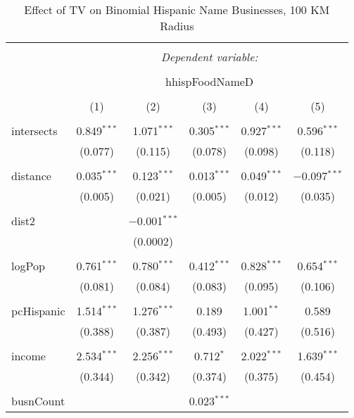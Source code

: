 
\begin{table}[!htbp] \centering 
  \caption{Effect of TV on Binomial Hispanic Name Businesses, 100 KM Radius} 
  \label{} 
\begin{tabular}{@{\extracolsep{-5pt}}lccccc} 
\\[-1.8ex]\hline 
\hline \\[-1.8ex] 
 & \multicolumn{5}{c}{\textit{Dependent variable:}} \\ 
\cline{2-6} 
\\[-1.8ex] & \multicolumn{5}{c}{hhispFoodNameD} \\ 
\\[-1.8ex] & (1) & (2) & (3) & (4) & (5)\\ 
\hline \\[-1.8ex] 
 intersects & 0.849$^{***}$ & 1.071$^{***}$ & 0.305$^{***}$ & 0.927$^{***}$ & 0.596$^{***}$ \\ 
  & (0.077) & (0.115) & (0.078) & (0.098) & (0.118) \\ 
  & & & & & \\ 
 distance & 0.035$^{***}$ & 0.123$^{***}$ & 0.013$^{***}$ & 0.049$^{***}$ & $-$0.097$^{***}$ \\ 
  & (0.005) & (0.021) & (0.005) & (0.012) & (0.035) \\ 
  & & & & & \\ 
 dist2 &  & $-$0.001$^{***}$ &  &  &  \\ 
  &  & (0.0002) &  &  &  \\ 
  & & & & & \\ 
 logPop & 0.761$^{***}$ & 0.780$^{***}$ & 0.412$^{***}$ & 0.828$^{***}$ & 0.654$^{***}$ \\ 
  & (0.081) & (0.084) & (0.083) & (0.095) & (0.106) \\ 
  & & & & & \\ 
 pcHispanic & 1.514$^{***}$ & 1.276$^{***}$ & 0.189 & 1.001$^{**}$ & 0.589 \\ 
  & (0.388) & (0.387) & (0.493) & (0.427) & (0.516) \\ 
  & & & & & \\ 
 income & 2.534$^{***}$ & 2.256$^{***}$ & 0.712$^{*}$ & 2.022$^{***}$ & 1.639$^{***}$ \\ 
  & (0.344) & (0.342) & (0.374) & (0.375) & (0.454) \\ 
  & & & & & \\ 
 busnCount &  &  & 0.023$^{***}$ &  &  \\ 

\end{tabular}
\end{table}
